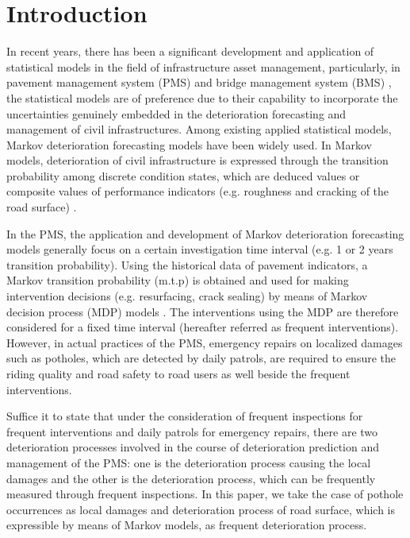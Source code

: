 \documentclass[Journal]{ascelike}
\begin{document}
\section{Introduction}\label{introduction}
In recent years, there has been a significant development and application of statistical models in the field of infrastructure asset management, particularly, in pavement management system (PMS) and bridge management system (BMS) \citep{Madanat1995,kobayashitsuda,Kobayashi2010a,Kobayashi2011}, the statistical models are of preference due to their capability to incorporate the uncertainties genuinely embedded in the deterioration forecasting and management  of civil infrastructures. Among existing applied statistical models, Markov deterioration forecasting models have been widely used. In Markov models, deterioration of civil infrastructure is expressed through the transition probability among discrete condition states, which are deduced values or composite values of performance indicators (e.g. roughness and cracking of the road surface) \citep{Kenneth2010}.

In the PMS, the application and development of Markov deterioration forecasting models generally focus on a certain investigation time interval (e.g. 1 or 2 years transition probability). Using the historical data of pavement indicators, a Markov transition probability (m.t.p) is obtained and used for making intervention decisions (e.g. resurfacing, crack sealing) by means of Markov decision process (MDP) models \citep{Madanat1993,Kobayashi2008b}. The interventions using the MDP are therefore considered for a fixed time interval (hereafter referred as frequent interventions). However, in actual practices of the PMS, emergency repairs on localized damages such as potholes, which are detected by daily patrols, are required to ensure the riding quality and road safety to road users as well beside the frequent interventions. 

Suffice it to state that under the consideration of frequent inspections for frequent interventions and daily patrols for emergency repairs, there are two deterioration processes involved in the course of deterioration prediction and management of the PMS: one is the deterioration process causing the local damages and the other is the deterioration process, which can be frequently measured through frequent inspections. In this paper, we take the case of pothole occurrences as local damages and deterioration process of road surface, which is expressible by means of Markov models, as frequent deterioration process.
\end{document}
